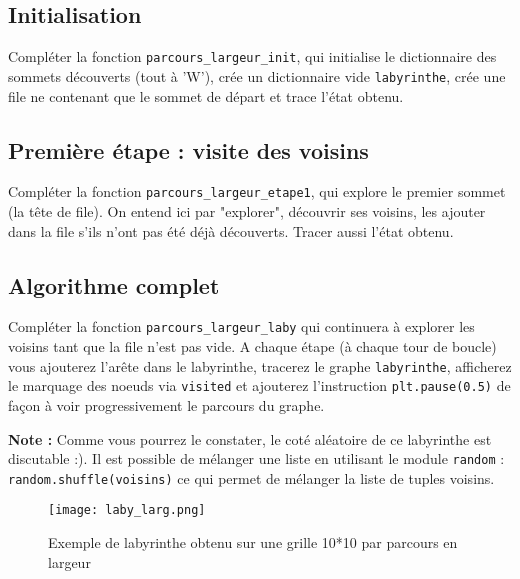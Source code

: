 \subsection{Initialisation}
\begin{question}
Compléter la fonction \texttt{parcours\_largeur\_init}, qui initialise le dictionnaire des sommets découverts (tout à 'W'), crée un dictionnaire vide \texttt{labyrinthe}, crée une file ne contenant que le sommet de départ et trace l'état obtenu.
\end{question}


\subsection{Première étape : visite des voisins}
\begin{question}
Compléter la fonction \texttt{parcours\_largeur\_etape1}, qui explore le premier sommet (la tête de file). On entend ici par "explorer", découvrir ses voisins, les ajouter dans la file s'ils n'ont pas été déjà découverts. Tracer aussi l'état obtenu. 
\end{question}

\subsection{Algorithme complet}
\begin{question}
Compléter la fonction \texttt{parcours\_largeur\_laby} qui continuera à explorer les voisins tant que la file n'est pas vide. A chaque étape (à chaque tour de boucle) vous ajouterez l'arête dans le labyrinthe, tracerez le graphe \texttt{labyrinthe}, afficherez le marquage des noeuds via \texttt{visited} et ajouterez l'instruction \texttt{plt.pause(0.5)} de façon à voir progressivement le parcours du graphe.
\end{question}

\textbf{Note :} Comme vous pourrez le constater, le coté aléatoire de ce labyrinthe est discutable :). Il est possible de mélanger une liste en utilisant le module \texttt{random} : \texttt{random.shuffle(voisins)} ce qui permet de mélanger la liste de tuples voisins.


\begin{figure}[!h]\centering
\texttt{[image: laby\_larg.png]}
\vspace{-0.7cm}
\caption{Exemple de labyrinthe obtenu sur une grille 10*10 par parcours en largeur}

\end{figure}

